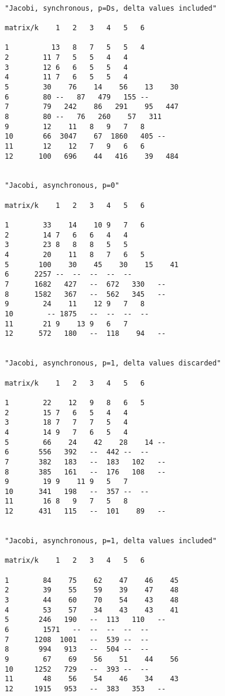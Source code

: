 \documentclass[12pt]{article}
\begin{document}
\begin{verbatim}
													
"Jacobi, synchronous, p=Ds, delta values included"												
													
matrix/k	1	2	3	4	5	6		

1          13	8	7	5	5	4							
2	     11	7	5	5	4	4							
3	     12	6	6	5	5	4							
4	     11	7	6	5	5	4							
5	     30    76    14    56    13    30							
6	     80	--   87   479   155	--							
7	     79   242    86   291    95   447							
8	     80	--   76   260    57   311							
9	     12    11	8	9	7	8							
10	     66  3047    67  1860   405	--							
11	     12    12	7	9	6	6							
12	    100   696    44   416    39   484							
													
													
"Jacobi, asynchronous, p=0"												
													
matrix/k	1	2	3	4	5	6			

1	     33    14    10	9	7	6							
2	     14	7	6	6	4	4							
3	     23	8	8	8	5	5							
4	     20    11	8	7	6	5							
5	    100    30    45    30    15    41							
6	   2257	--	--	--	--	--							
7	   1682   427	--  672   330	--							
8	   1582   367	--  562   345	--							
9	     24    11    12	9	7	8							
10	      -- 1875	--	--	--	--							
11	     21	9    13	9	6	7							
12	    572   180	--  118    94	--							
													
													
"Jacobi, asynchronous, p=1, delta values discarded"												
													
matrix/k	1	2	3	4	5	6			

1	     22    12	9	8	6	5							
2	     15	7	6	5	4	4							
3	     18	7	7	7	5	4							
4	     14	9	7	6	5	4							
5	     66    24    42    28    14	--							
6	    556   392	--  442	--	--							
7	    382   183	--  183   102	--							
8	    385   161	--  176   108	--							
9	     19	9    11	9	5	7							
10	    341   198	--  357	--	--							
11	     16	8	9	7	5	8							
12	    431   115	--  101    89	--							
													
													
"Jacobi, asynchronous, p=1, delta values included"										
													
matrix/k	1	2	3	4	5	6		

1	     84    75    62    47    46    45							
2	     39    55    59    39    47    48							
3	     44    60    70    54    43    48							
4	     53    57    34    43    43    41							
5	    246   190	--  113   110	--							
6        1571	--	--	--	--	--							
7	   1208  1001	--  539	--	--							
8	    994   913	--  504	--	--							
9	     67    69    56    51    44    56							
10	   1252   729	--  393	--	--							
11	     48    56    54    46    34    43							
12	   1915   953	--  383   353	--							
													

\end{verbatim}
\end{document}
